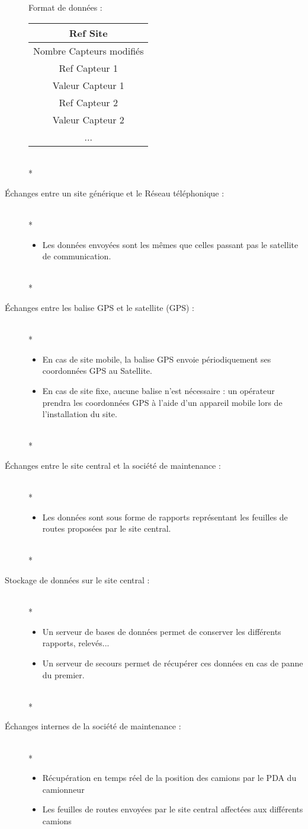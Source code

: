 \begin{description}
	Format de données : 
	\begin{tabular}{|c|}
	\hline
	Ref Site\\
	\hline
	Nombre Capteurs modifiés\\
	\hline
	Ref Capteur 1\\
	\hline
	Valeur Capteur 1\\
	\hline
	Ref Capteur 2\\
	\hline
	Valeur Capteur 2\\
	\hline
	...\\
	\hline
	\end{tabular}
~\\*
\item[Échanges entre un site générique et le Réseau téléphonique :]~\\*
	\begin{itemize}
		\item Les données envoyées sont les mêmes que celles passant pas le satellite de communication.
	\end{itemize}
~\\*
\item[Échanges entre les balise GPS et le satellite (GPS) :] ~\\*
	\begin{itemize}
		\item En cas de site mobile, la balise GPS envoie périodiquement ses coordonnées GPS au Satellite. 
		\item En cas de site fixe, aucune balise n'est nécessaire : un opérateur prendra les coordonnées GPS à l'aide d'un appareil mobile lors de 			l'installation du site.
	\end{itemize}
~\\*
\item[Échanges entre le site central et la société de maintenance :]~\\*
	\begin{itemize}
		\item Les données sont sous forme de rapports représentant les feuilles de routes proposées par le site central.
	\end{itemize}
~\\*
\item[Stockage de données sur le site central :]~\\*
	\begin{itemize}
		\item Un serveur de bases de données permet de conserver les différents rapports, relevés... 
		\item Un serveur de secours permet de récupérer ces données en cas de panne du premier.
	\end{itemize}
~\\*
\item [Échanges internes de la société de maintenance :]~\\*
	\begin{itemize}
		\item Récupération en temps réel de la position des camions par le PDA du camionneur
		\item Les feuilles de routes envoyées par le site central affectées aux différents camions
	\end{itemize}
\end{description}
